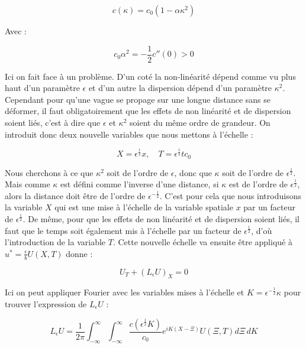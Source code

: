 \begin{equation}
    c(\kappa) = c_0 ( 1 - \alpha \kappa^2 )
\end{equation}

Avec :

\begin{equation*}
    c_0 \alpha^2 = -\frac{1}{2} c''(0) > 0
\end{equation*}

Ici on fait face à un problème. D'un coté la non-linéarité dépend comme vu plus haut d'un paramètre $\epsilon$ et d'un autre la dispersion dépend d'un paramètre $\kappa^2$. Cependant pour qu'une vague se propage sur une longue distance sans se déformer, il faut obligatoirement que les effets de non linéarité et de dispersion soient liés, c'est à dire que $\epsilon$ et $\kappa^2$ soient du même ordre de grandeur. On introduit donc deux nouvelle variables que nous mettons à l'échelle :

\begin{equation*}
    X = \epsilon^{\frac{1}{2}} x, \quad T = \epsilon^{\frac{1}{2}} t c_0
\end{equation*}

Nous cherchons à ce que $\kappa^2$ soit de l'ordre de $\epsilon$, donc que $\kappa$ soit de l'ordre de $\epsilon^{\frac{1}{2}}$. Mais comme $\kappa$ est défini comme l'inverse d'une distance, si $\kappa$ est de l'ordre de $\epsilon^{\frac{1}{2}}$, alors la distance doit être de l'ordre de $\epsilon^{-\frac{1}{2}}$. C'est pour cela que nous introduisons la variable $X$ qui est une mise à l'échelle de la variable spatiale $x$ par un facteur de $\epsilon^{\frac{1}{2}}$. De même, pour que les effets de non linéarité et de dispersion soient liés, il faut que le temps soit également mis à l'échelle par un facteur de $\epsilon^{\frac{1}{2}}$, d'où l'introduction de la variable $T$. Cette nouvelle échelle va ensuite être appliqué à $u^* = \frac{\epsilon}{b} U(X,T)$ donne :

\begin{equation}
    U_T + (L_\epsilon U)_X = 0
    \label{eq:1}
\end{equation}

Ici on peut appliquer Fourier avec les variables mises à l'échelle et $K = \epsilon^{-\frac{1}{2}} \kappa$ pour trouver l'expression de $L_\epsilon U$ :

\begin{equation*}
    L_\epsilon U = \frac{1}{2\pi} \int_{-\infty}^{\infty} \int_{-\infty}^{\infty} \frac{c(\epsilon^{\frac{1}{2}} K)}{c_0} e^{iK(X - \Xi)} U(\Xi, T) d\Xi \, dK
\end{equation*}

